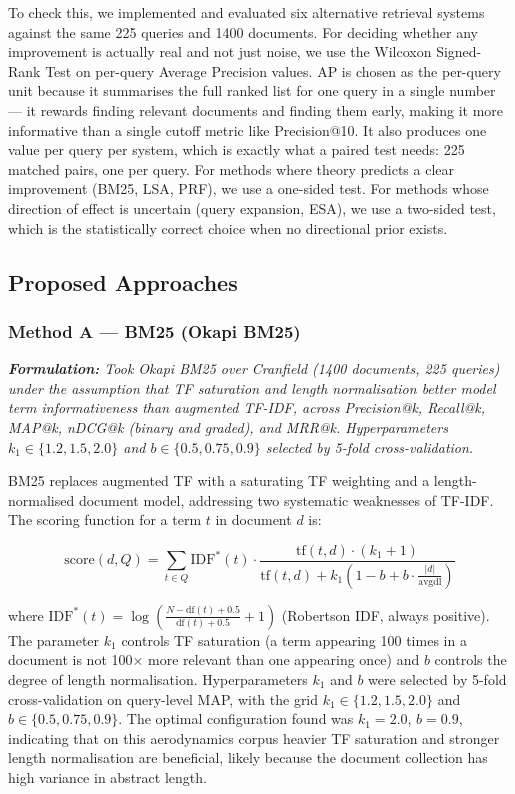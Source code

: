 \documentclass{svproc}
\begin{document}
    To check this, we implemented and evaluated six alternative retrieval systems against the same 225 queries and 1400 documents. For deciding whether any improvement is actually real and not just noise, we use the Wilcoxon Signed-Rank Test on per-query Average Precision values. AP is chosen as the per-query unit because it summarises the full ranked list for one query in a single number — it rewards finding relevant documents and finding them early, making it more informative than a single cutoff metric like Precision@10. It also produces one value per query per system, which is exactly what a paired test needs: 225 matched pairs, one per query. For methods where theory predicts a clear improvement (BM25, LSA, PRF), we use a one-sided test. For methods whose direction of effect is uncertain (query expansion, ESA), we use a two-sided test, which is the statistically correct choice when no directional prior exists.

    \subsection{Proposed Approaches}

    \subsubsection{Method A — BM25 (Okapi BM25)}

    \textit{\textbf{Formulation:} Took Okapi BM25 over Cranfield (1400 documents, 225 queries) under the assumption that TF saturation and length normalisation better model term informativeness than augmented TF-IDF, across Precision@k, Recall@k, MAP@k, nDCG@k (binary and graded), and MRR@k. Hyperparameters $k_1 \in \{1.2, 1.5, 2.0\}$ and $b \in \{0.5, 0.75, 0.9\}$ selected by 5-fold cross-validation.}

    BM25 replaces augmented TF with a saturating TF weighting and a length-normalised document model, addressing two systematic weaknesses of TF-IDF. The scoring function for a term $t$ in document $d$ is:

    \[
    \mathrm{score}(d, Q) = \sum_{t \in Q} \mathrm{IDF}^*(t) \cdot \frac{\mathrm{tf}(t,d) \cdot (k_1 + 1)}{\mathrm{tf}(t,d) + k_1\!\left(1 - b + b \cdot \frac{|d|}{\mathrm{avgdl}}\right)}
    \]

    where $\mathrm{IDF}^*(t) = \log\!\left(\frac{N - \mathrm{df}(t) + 0.5}{\mathrm{df}(t) + 0.5} + 1\right)$ (Robertson IDF, always positive). The parameter $k_1$ controls TF saturation (a term appearing 100 times in a document is not 100$\times$ more relevant than one appearing once) and $b$ controls the degree of length normalisation. Hyperparameters $k_1$ and $b$ were selected by 5-fold cross-validation on query-level MAP, with the grid $k_1 \in \{1.2, 1.5, 2.0\}$ and $b \in \{0.5, 0.75, 0.9\}$. The optimal configuration found was $k_1{=}2.0$, $b{=}0.9$, indicating that on this aerodynamics corpus heavier TF saturation and stronger length normalisation are beneficial, likely because the document collection has high variance in abstract length.
\end{document}
